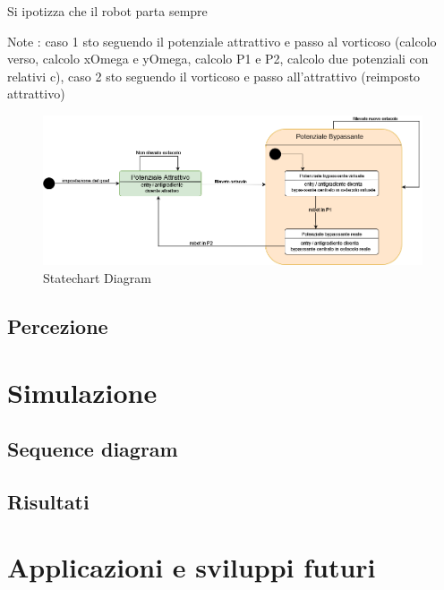 \documentclass[14pt,a4paper]{extarticle}
\begin{document}
Si ipotizza che il robot parta sempre 

Note	: caso 1 sto seguendo il potenziale attrattivo e passo al vorticoso (calcolo verso, calcolo xOmega e yOmega, calcolo P1 e P2, calcolo due potenziali con relativi c), caso 2 sto seguendo il vorticoso e passo all'attrattivo (reimposto attrattivo)

\begin{figure}[H]
\caption{Statechart Diagram} \label{state}
\includegraphics[width=\textwidth]{statechart.png}
\end{figure}

\subsection{Percezione}

\section{Simulazione}

\subsection{Sequence diagram}

\subsection{Risultati}

\section{Applicazioni e sviluppi futuri}

\newpage
\listoffigures
\printbibliography
\end{document}
